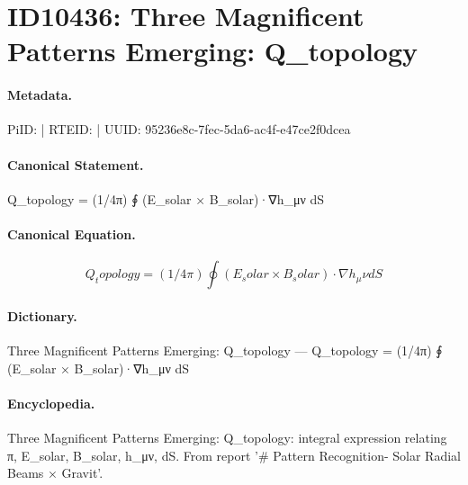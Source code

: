 \section*{ID10436: Three Magnificent Patterns Emerging: Q\_topology}
\paragraph{Metadata.}
PiID:  | RTEID:  | UUID: 95236e8c-7fec-5da6-ac4f-e47ce2f0dcea

\paragraph{Canonical Statement.}
Q\_topology = (1/4π) ∮ (E\_solar × B\_solar)·∇h\_μν dS

\paragraph{Canonical Equation.}
\[
Q_topology = (1/4π) ∮ (E_solar × B_solar)·∇h_μν dS
\]

\paragraph{Dictionary.}
Three Magnificent Patterns Emerging: Q\_topology — Q\_topology = (1/4π) ∮ (E\_solar × B\_solar)·∇h\_μν dS

\paragraph{Encyclopedia.}
Three Magnificent Patterns Emerging: Q\_topology: integral expression relating π, E\_solar, B\_solar, h\_μν, dS. From report '\# Pattern Recognition- Solar Radial Beams × Gravit'.

